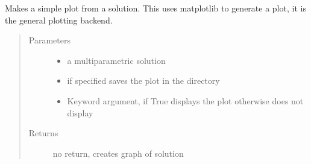 \documentclass[letterpaper,10pt,english]{sphinxmanual}
\begin{document}
\begin{fulllineitems}
\label{\detokenize{ppopt:ppopt.plot.parametric_plot}}
\sphinxAtStartPar
Makes a simple plot from a solution. This uses matplotlib to generate a plot, it is the general plotting backend.
\begin{quote}\begin{description}
\item[{Parameters}] \leavevmode\begin{itemize}
\item {} 
\sphinxAtStartPar
{} \textendash{} a multiparametric solution

\item {} 
\sphinxAtStartPar
{} \textendash{} if specified saves the plot in the directory

\item {} 
\sphinxAtStartPar
{} \textendash{} Keyword argument, if True displays the plot otherwise does not display

\end{itemize}

\item[{Returns}] \leavevmode
\sphinxAtStartPar
no return, creates graph of solution

\end{description}\end{quote}

\end{fulllineitems}

\end{document}
